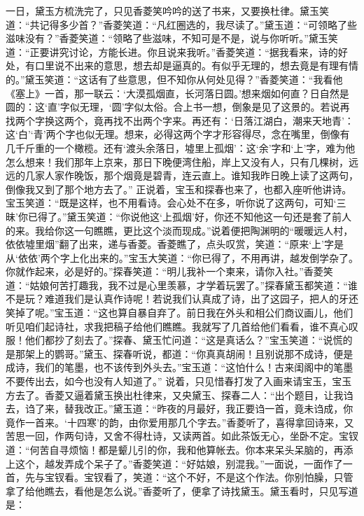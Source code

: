 \documentclass[12pt,oneside]{book}
\begin{document}
一日，黛玉方梳洗完了，只见香菱笑吟吟的送了书来，又要换杜律。黛玉笑道：“共记得多少首？”香菱笑道：“凡红圈选的，我尽读了。”黛玉道：“可领略了些滋味没有？”香菱笑道：“领略了些滋味，不知可是不是，说与你听听。”黛玉笑道：“正要讲究讨论，方能长进。你且说来我听。”香菱笑道：“据我看来，诗的好处，有口里说不出来的意思，想去却是逼真的。有似乎无理的，想去竟是有理有情的。”黛玉笑道：“这话有了些意思，但不知你从何处见得？”香菱笑道：“我看他《塞上》一首，那一联云：‘大漠孤烟直，长河落日圆。’想来烟如何直？日自然是圆的：这‘直’字似无理，‘圆’字似太俗。合上书一想，倒象是见了这景的。若说再找两个字换这两个，竟再找不出两个字来。再还有：‘日落江湖白，潮来天地青’：这‘白’‘青’两个字也似无理。想来，必得这两个字才形容得尽，念在嘴里，倒像有几千斤重的一个橄榄。还有‘渡头余落日，墟里上孤烟’：这‘余’字和‘上’字，难为他怎么想来！我们那年上京来，那日下晚便湾住船，岸上又没有人，只有几棵树，远远的几家人家作晚饭，那个烟竟是碧青，连云直上。谁知我昨日晚上读了这两句，倒像我又到了那个地方去了。”
正说着，宝玉和探春也来了，也都入座听他讲诗。宝玉笑道：“既是这样，也不用看诗。会心处不在多，听你说了这两句，可知‘三昧’你已得了。”黛玉笑道：“你说他这‘上孤烟’好，你还不知他这一句还是套了前人的来。我给你这一句瞧瞧，更比这个淡而现成。”说着便把陶渊明的“暖暖远人村，依依墟里烟”翻了出来，递与香菱。香菱瞧了，点头叹赏，笑道：“原来‘上’字是从‘依依’两个字上化出来的。”宝玉大笑道：“你已得了，不用再讲，越发倒学杂了。你就作起来，必是好的。”探春笑道：“明儿我补一个柬来，请你入社。”香菱笑道：“姑娘何苦打趣我，我不过是心里羡慕，才学着玩罢了。”探春黛玉都笑道：“谁不是玩？难道我们是认真作诗呢！若说我们认真成了诗，出了这园子，把人的牙还笑掉了呢。”宝玉道：“这也算自暴自弃了。前日我在外头和相公们商议画儿，他们听见咱们起诗社，求我把稿子给他们瞧瞧。我就写了几首给他们看看，谁不真心叹服！他们都抄了刻去了。”探春、黛玉忙问道：“这是真话么？”宝玉笑道：“说慌的是那架上的鹦哥。”黛玉、探春听说，都道：“你真真胡闹！且别说那不成诗，便是成诗，我们的笔墨，也不该传到外头去。”宝玉道：“这怕什么！古来闺阁中的笔墨不要传出去，如今也没有人知道了。”
说着，只见惜春打发了入画来请宝玉，宝玉方去了。香菱又逼着黛玉换出杜律来，又央黛玉、探春二人：“出个题目，让我诌去，诌了来，替我改正。”黛玉道：“昨夜的月最好，我正要诌一首，竟未诌成，你竟作一首来。‘十四寒’的韵，由你爱用那几个字去。”香菱听了，喜得拿回诗来，又苦思一回，作两句诗，又舍不得杜诗，又读两首。如此茶饭无心，坐卧不定。宝钗道：“何苦自寻烦恼！都是颦儿引的你，我和他算帐去。你本来呆头呆脑的，再添上这个，越发弄成个呆子了。”香菱笑道：“好姑娘，别混我。”一面说，一面作了一首，先与宝钗看。宝钗看了，笑道：“这个不好，不是这个作法。你别怕臊，只管拿了给他瞧去，看他是怎么说。”香菱听了，便拿了诗找黛玉。黛玉看时，只见写道是：
\end{document}
